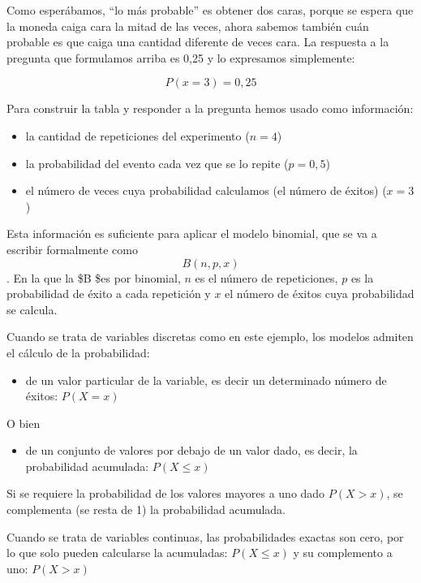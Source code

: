 \documentclass[]{article}
\providecommand{\tightlist}{%
  \setlength{\itemsep}{0pt}\setlength{\parskip}{0pt}}
\begin{document}
Como esperábamos, ``lo más probable'' es obtener dos caras, porque se
espera que la moneda caiga cara la mitad de las veces, ahora sabemos
también cuán probable es que caiga una cantidad diferente de veces cara.
La respuesta a la pregunta que formulamos arriba es 0,25 y lo expresamos
simplemente:

\[P(x = 3) = 0,25\]

Para construir la tabla y responder a la pregunta hemos usado como
información:

\begin{itemize}
\item
  la cantidad de repeticiones del experimento (\(n=4\))
\item
  la probabilidad del evento cada vez que se lo repite (\(p=0,5\))
\item
  el número de veces cuya probabilidad calculamos (el número de éxitos)
  (\(x=3\))
\end{itemize}

Esta información es suficiente para aplicar el modelo binomial, que se
va a escribir formalmente como \[B(n, p, x)\]. En la que la \$B \$es por
binomial, \(n\) es el número de repeticiones, \(p\) es la probabilidad
de éxito a cada repetición y \(x\) el número de éxitos cuya probabilidad
se calcula.

Cuando se trata de variables discretas como en este ejemplo, los modelos
admiten el cálculo de la probabilidad:

\begin{itemize}
\tightlist
\item
  de un valor particular de la variable, es decir un determinado número
  de éxitos: \(P(X=x)\)
\end{itemize}

O bien

\begin{itemize}
\tightlist
\item
  de un conjunto de valores por debajo de un valor dado, es decir, la
  probabilidad acumulada: \(P(X\leq x)\)
\end{itemize}

Si se requiere la probabilidad de los valores mayores a uno dado
\(P(X>x)\), se complementa (se resta de 1) la probabilidad acumulada.

Cuando se trata de variables continuas, las probabilidades exactas son
cero, por lo que solo pueden calcularse la acumuladas: \(P(X\leq x)\) y
su complemento a uno: \(P(X>x)\)
\end{document}
